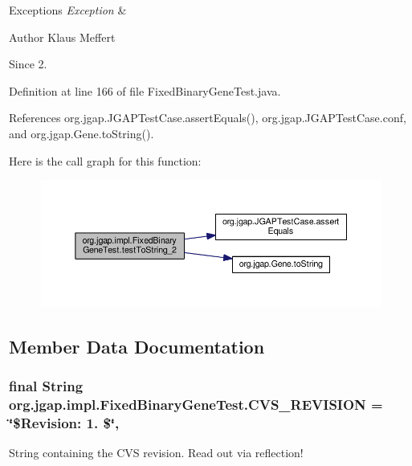 \begin{DoxyExceptions}{Exceptions}
{\em Exception} & \\
\hline
\end{DoxyExceptions}
\begin{DoxyAuthor}{Author}
Klaus Meffert 
\end{DoxyAuthor}
\begin{DoxySince}{Since}
2. 
\end{DoxySince}


Definition at line 166 of file Fixed\-Binary\-Gene\-Test.\-java.



References org.\-jgap.\-J\-G\-A\-P\-Test\-Case.\-assert\-Equals(), org.\-jgap.\-J\-G\-A\-P\-Test\-Case.\-conf, and org.\-jgap.\-Gene.\-to\-String().



Here is the call graph for this function\-:
\nopagebreak
\begin{figure}[H]
\begin{center}
\leavevmode
\includegraphics[width=350pt]{classorg_1_1jgap_1_1impl_1_1_fixed_binary_gene_test_a3795203a4324069a9e828f86761d8214_cgraph}
\end{center}
\end{figure}




\subsection{Member Data Documentation}
\hypertarget{classorg_1_1jgap_1_1impl_1_1_fixed_binary_gene_test_ab8e3d581b0d68da946dd457539682c07}{
\subsubsection[{C\-V\-S\-\_\-\-R\-E\-V\-I\-S\-I\-O\-N}]{\setlength{\rightskip}{0pt plus 5cm}final String org.\-jgap.\-impl.\-Fixed\-Binary\-Gene\-Test.\-C\-V\-S\-\_\-\-R\-E\-V\-I\-S\-I\-O\-N = \char`\"{}\$Revision\-: 1. \$\char`\"{}\hspace{0.3cm}{\ttfamily [static]}, {\ttfamily [private]}}}\label{classorg_1_1jgap_1_1impl_1_1_fixed_binary_gene_test_ab8e3d581b0d68da946dd457539682c07}
String containing the C\-V\-S revision. Read out via reflection! 

